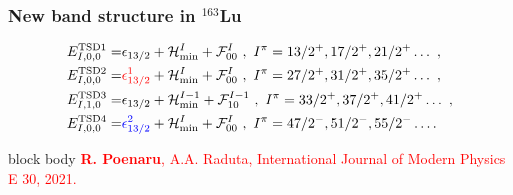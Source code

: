 \documentclass{beamer}
\begin{document}
\begin{frame}
	\frametitle{New band structure in $^{163}$Lu}
	\vspace{-0.5cm}
	\begin{align}
		E_{I,0,0}^\text{TSD1}=&\epsilon_{13/2}+\mathcal{H}_\text{min}^I+\mathcal{F}_{00}^I\nonumber\ ,\ I^\pi=13/2^+,17/2^+,21/2^+\dots\ ,\\
		E_{I,0,0}^\text{TSD2}=&{\color{red}\epsilon_{13/2}^1}+\mathcal{H}_\text{min}^I+\mathcal{F}_{00}^I\nonumber\ ,\ I^\pi=27/2^+,31/2^+,35/2^+\dots\ ,\\
		E_{I,1,0}^\text{TSD3}=&\epsilon_{13/2}+\mathcal{H}_\text{min}^{I-1}+\mathcal{F}_{10}^{I-1}\nonumber\ ,\ I^\pi=33/2^+,37/2^+,41/2^+\dots\ ,\\
		E_{I,0,0}^\text{TSD4}=&{\color{blue}\epsilon_{13/2}^2}+\mathcal{H}_\text{min}^I+\mathcal{F}_{00}^I\ ,\ I^\pi=47/2^-,51/2^-,55/2^-\dots\nonumber.
	\end{align}
	\vspace{-1cm}
	\begin{table}
		\centering
	\end{table}
	\begin{beamercolorbox}[rounded=true,shadow=false, wd=\linewidth,]{block body}
		\centering
		\textcolor{red}{\footnotesize{\textbf{R. Poenaru}, A.A. Raduta, International Journal of Modern Physics E 30, 2021.}}
	\end{beamercolorbox}
\end{frame}
\end{document}
